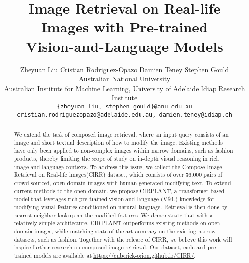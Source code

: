 \documentclass[10pt,twocolumn,letterpaper]{article}
\newcommand{\dstname}{CIRR\xspace}
\newcommand{\dstnamefull}{Compose Image Retrieval on Real-life images\xspace}
\newcommand{\modelname}{CIRPLANT\xspace}
\newcommand{\dsturl}{\url{https://cuberick-orion.github.io/CIRR/}\xspace}
\begin{document}
\title{Image Retrieval on Real-life Images with Pre-trained \\Vision-and-Language Models}

\author{Zheyuan Liu \quad Cristian Rodriguez-Opazo \quad Damien Teney \quad Stephen Gould \\
Australian National University\\
Australian Institute for Machine Learning, University of Adelaide\quad
Idiap Research Institute \\
{\tt\small \{zheyuan.liu, stephen.gould\}@anu.edu.au} \\
{\tt\small cristian.rodriguezopazo@adelaide.edu.au, damien.teney@idiap.ch}
}

\maketitle

\ificcvfinal\thispagestyle{empty}\fi

\begin{abstract}
   We extend the task of composed image retrieval, where an input query consists of an image and short textual description of how to modify the image.
   Existing methods have only been applied to non-complex images within narrow domains, such as fashion products,
   thereby limiting the scope of study on in-depth visual reasoning in rich image and language contexts.
   To address this issue, we collect the \dstnamefull (\dstname) dataset, which consists of over 36,000 pairs of crowd-sourced, open-domain images with human-generated modifying text.
   To extend current methods to the open-domain, we propose \modelname, a transformer based model that leverages rich pre-trained vision-and-language (V\&L) knowledge for modifying visual features conditioned on natural language.
   Retrieval is then done by nearest neighbor lookup on the modified features.
   We demonstrate that with a relatively simple architecture, \modelname outperforms existing methods on open-domain images, while matching state-of-the-art accuracy on the existing narrow datasets, such as fashion.
   Together with the release of \dstname, we believe this work will inspire further research on composed image retrieval.
   Our dataset, code and pre-trained models are available at \dsturl.
\end{abstract}
\end{document}

